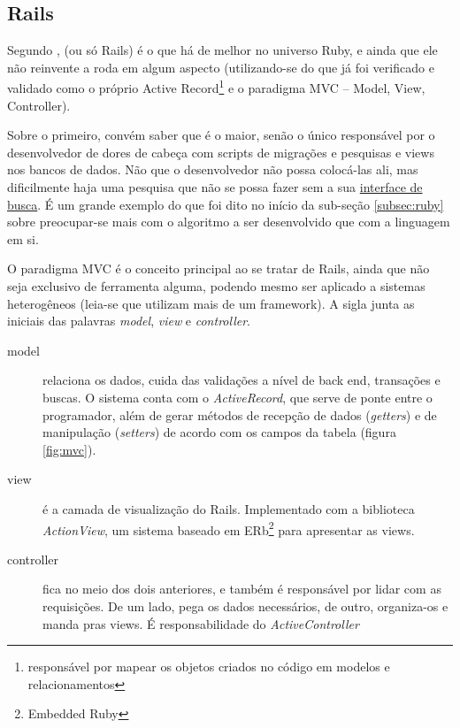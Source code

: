 \subsection{Rails}
\label{subsec:rails}

Segundo \cite[p.~613]{Rcook:09},  (ou só Rails) é o que há de melhor
no universo Ruby, e ainda que ele não reinvente a roda em algum aspecto (utilizando-se
do que já foi verificado e validado como o próprio Active Record\footnote{responsável
por mapear os objetos criados no código em modelos e relacionamentos} e o paradigma MVC
-- Model, View, Controller).

Sobre o primeiro, convém saber que é o maior, senão o único responsável por 
o desenvolvedor de dores de cabeça com scripts de migrações e pesquisas e views nos
bancos de dados. Não que o desenvolvedor não possa colocá-las ali, mas dificilmente
haja uma pesquisa que não se possa fazer sem a sua
\href{https://guides.rubyonrails.org/active_record_querying.html}{interface de busca}.
É um grande exemplo do que foi dito no início da sub-seção \ref{subsec:ruby} sobre
preocupar-se mais com o algoritmo a ser desenvolvido que com a linguagem em si.

O paradigma MVC é o conceito principal ao se tratar de Rails, ainda que não seja exclusivo
de ferramenta alguma, podendo mesmo ser aplicado a sistemas heterogêneos (leia-se que
utilizam mais de um framework). A sigla junta as iniciais das palavras \emph{model},
\emph{view} e \emph{controller}.
\begin{description}
    \item[model] relaciona os dados, cuida das validações a nível de back end, transações
    e buscas. O sistema conta com o \emph{ActiveRecord}, que serve de ponte entre o
    programador, além de gerar métodos de recepção de dados (\emph{getters}) e de manipulação
    (\emph{setters}) de acordo com os campos da tabela (figura \ref{fig:mvc}).
    \item[view] é a camada de visualização do Rails. Implementado com a biblioteca
    \emph{ActionView}, um sistema baseado em ERb\footnote{Embedded Ruby} para apresentar as
    views.
    \item[controller] fica no meio dos dois anteriores, e também é responsável por lidar com
    as requisições. De um lado, pega os dados necessários, de outro, organiza-os e manda pras
    views. É responsabilidade do \emph{ActiveController}
\end{description}

